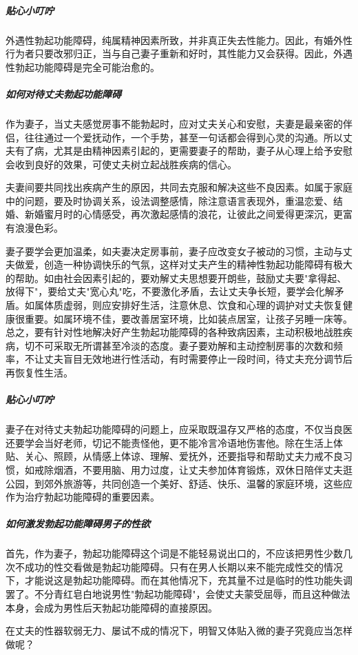 \subparagraph{贴心小叮咛}

外遇性勃起功能障碍，纯属精神因素所致，并非真正失去性能力。因此，有婚外性行为者只要改邪归正，当与自己妻子重新和好时，其性能力又会获得。因此，外遇性勃起功能障碍是完全可能治愈的。

\subparagraph{如何对待丈夫勃起功能障碍}

作为妻子，当丈夫感觉房事不能勃起时，应对丈夫关心和安慰，夫妻是最亲密的伴侣，往往通过一个爱抚动作，一个手势，甚至一句话都会得到心灵的沟通。所以丈夫有了病，尤其是由精神因素引起的，更需要妻子的帮助，妻子从心理上给予安慰会收到良好的效果，可使丈夫树立起战胜疾病的信心。

夫妻间要共同找出疾病产生的原因，共同去克服和解决这些不良因素。如属于家庭中的问题，要及时协调关系，设法调整感情，除注意语言表现外，重温恋爱、结婚、新婚蜜月时的心情感受，再次激起感情的浪花，让彼此之间爱得更深沉，更富有浪漫色彩。

妻子要学会更加温柔，如夫妻决定房事前，妻子应改变女子被动的习惯，主动与丈夫做爱，创造一种协调快乐的气氛，这样对丈夫产生的精神性勃起功能障碍有极大的帮助。如由社会因素引起的，要劝解丈夫思想要开朗些，鼓励丈夫要"拿得起、放得下"，要给丈夫"宽心丸"吃，不要激化矛盾，去让丈夫争长短，要学会化解矛盾。如属体质虚弱，则应安排好生活，注意休息、饮食和心理的调护对丈夫恢复健康很重要。如属环境不佳，要改善居室环境，比如装点居室，让孩子另睡一床等。总之，要有针对性地解决好产生勃起功能障碍的各种致病因素，主动积极地战胜疾病，切不可采取无所谓甚至冷淡的态度。妻子要劝解和主动控制房事的次数和频率，不让丈夫盲目无效地进行性活动，有时需要停止一段时间，待丈夫充分调节后再恢复性生活。

\subparagraph{贴心小叮咛}

妻子在对待丈夫勃起功能障碍的问题上，应采取既温存又严格的态度，不仅当良医还要学会当好老师，切记不能责怪他，更不能冷言冷语地伤害他。除在生活上体贴、关心、照顾，从情感上体谅、理解、爱抚外，还要指导和帮助丈夫力戒不良习惯，如戒除烟酒，不要用脑、用力过度，让丈夫参加体育锻炼，双休日陪伴丈夫逛公园，到郊外旅游等，共同创造一个美好、舒适、快乐、温馨的家庭环境，这些应作为治疗勃起功能障碍的重要因素。

\subparagraph{如何激发勃起功能障碍男子的性欲}

首先，作为妻子，勃起功能障碍这个词是不能轻易说出口的，不应该把男性少数几次不成功的性交看做是勃起功能障碍。只有在男人长期以来不能完成性交的情况下，才能说这是勃起功能障碍。而在其他情况下，充其量不过是临时的性功能失调罢了。不分青红皂白地说男性"勃起功能障碍"，会使丈夫蒙受屈辱，而且这种做法本身，会成为男性后天勃起功能障碍的直接原因。

在丈夫的性器软弱无力、屡试不成的情况下，明智又体贴入微的妻子究竟应当怎样做呢？

